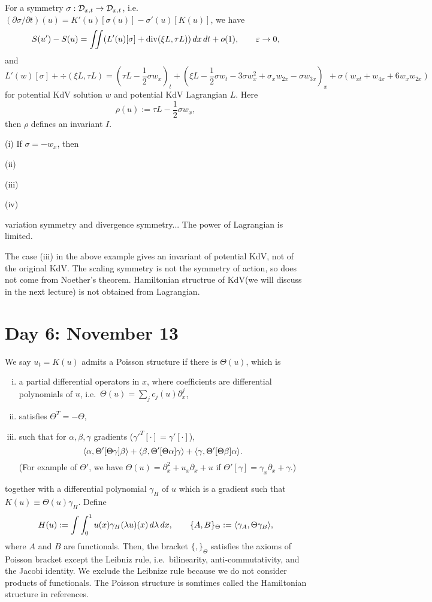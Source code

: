 \documentclass{../../../small}
\begin{document}
For a symmetry $\sigma:\mathcal{D}_{x,t}\to\mathcal{D}_{x,t}$, i.e.~$(\partial\sigma/\partial t)(u)=K'(u)[\sigma(u)]-\sigma'(u)[K(u)]$, we have
\[S(u')-S(u)=\iint(L'(u)[\sigma]+\operatorname{div}(\xi L,\tau L))\,dx\,dt+o(1),\qquad \varepsilon\to0,\]
and
\[L'(w)[\sigma]+\div(\xi L,\tau L)=(\tau L-\frac12\sigma w_x)_t+(\xi L-\frac12\sigma w_t-3\sigma w_x^2+\sigma_xw_{2x}-\sigma w_{3x})_x+\sigma(w_{xt}+w_{4x}+6w_xw_{2x})\]
for potential KdV solution $w$ and potential KdV Lagrangian $L$.
Here
\[\rho(u):=\tau L-\frac12\sigma w_x,\]
then $\rho$ defines an invariant $I$.

\begin{ex}
(i)
If $\sigma=-w_x$, then

(ii)

(iii)

(iv)
\end{ex}


variation symmetry and divergence symmetry...
The power of Lagrangian is limited.

\begin{rmk}
The case (iii) in the above example gives an invariant of potential KdV, not of the original KdV.
The scaling symmetry is not the symmetry of action, so does not come from Noether's theorem.
Hamiltonian structrue of KdV(we will discuss in the next lecture) is not obtained from Lagrangian.
\end{rmk}



\newpage
\section{Day 6: November 13}

We say $u_t=K(u)$ admits a Poisson structure if there is $\Theta(u)$, which is
\begin{enumerate}[(i)]
\item a partial differential operators in $x$, where coefficients are differential polynomials of $u$, i.e.~$\Theta(u)=\sum_jc_j(u)\partial_x^j$,
\item satisfies $\Theta^T=-\Theta$,
\item such that for $\alpha,\beta,\gamma$ gradients ($\gamma'^T[\cdot]=\gamma'[\cdot]$),
\[\langle\alpha,\Theta'[\Theta\gamma]\beta\rangle+\langle\beta,\Theta'[\Theta\alpha]\gamma\rangle+\langle\gamma,\Theta'[\Theta\beta]\alpha\rangle.\]
(For example of $\Theta'$, we have $\Theta(u)=\partial_x^2+u_x\partial_x+u$ if $\Theta'[\gamma]=\gamma_x\partial_x+\gamma$.)
\end{enumerate}
together with a differential polynomial $\gamma_H$ of $u$ which is a gradient such that $K(u)\equiv\Theta(u)\gamma_H$.
Define
\[H(u):=\int\int_0^1u(x)\gamma_H(\lambda u)(x)\,d\lambda\,dx,\qquad\{A,B\}_\Theta:=\langle\gamma_A,\Theta\gamma_B\rangle,\]
where $A$ and $B$ are functionals.
Then, the bracket $\{,\}_\Theta$ satisfies the axioms of Poisson bracket except the Leibniz rule, i.e.~bilinearity, anti-commutativity, and the Jacobi identity.
We exclude the Leibnize rule because we do not consider products of functionals.
The Poisson structure is somtimes called the Hamiltonian structure in references.
\end{document}
